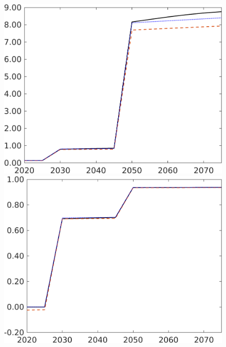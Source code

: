 \begin{figure}[h!!]
\begin{minipage}[]{0.32\textwidth}
	\end{minipage}
	\begin{minipage}[]{0.32\textwidth}
		\includegraphics[width=1\textwidth]{../../codding_model/own_basedOnFried/optimalPol_190722_tidiedUp/figures/all_July22/GFF_CompEffOPT_T_NoTaus_pol2_spillover0_noskill0_sep1_xgrowth0_etaa0.79_lgd0_lff0.png}
	\end{minipage}
	\begin{minipage}[]{0.32\textwidth}
		\includegraphics[width=1\textwidth]{../../codding_model/own_basedOnFried/optimalPol_190722_tidiedUp/figures/all_July22/tauf_CompEffOPT_T_NoTaus_pol2_spillover0_noskill0_sep1_xgrowth0_etaa0.79_lgd0_lff0.png}

\end{minipage}
\end{figure}
